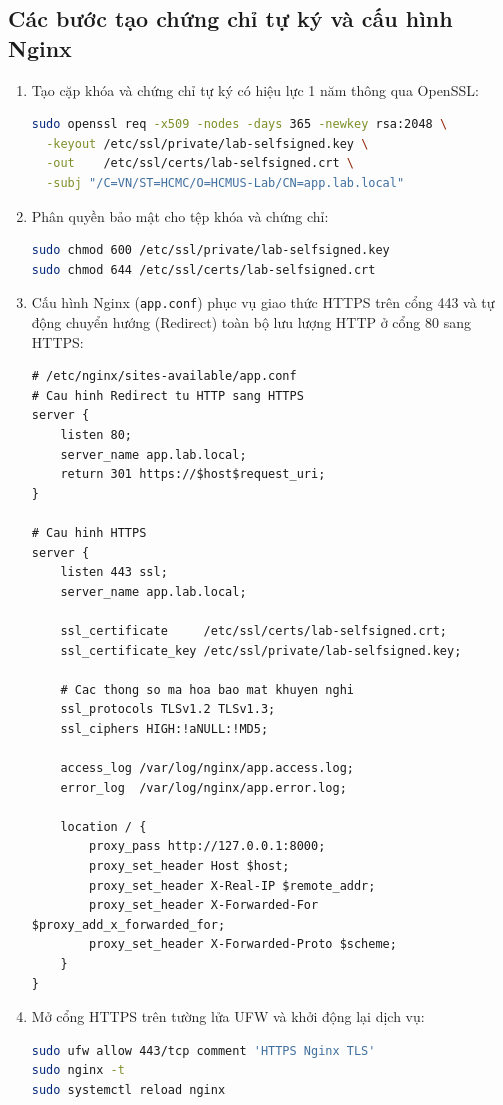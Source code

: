 \documentclass[a4paper,12pt]{article}
\begin{document}
\subsection{Các bước tạo chứng chỉ tự ký và cấu hình Nginx}
\begin{enumerate}
    \item Tạo cặp khóa và chứng chỉ tự ký có hiệu lực 1 năm thông qua OpenSSL:
    \begin{lstlisting}[language=bash]
sudo openssl req -x509 -nodes -days 365 -newkey rsa:2048 \
  -keyout /etc/ssl/private/lab-selfsigned.key \
  -out    /etc/ssl/certs/lab-selfsigned.crt \
  -subj "/C=VN/ST=HCMC/O=HCMUS-Lab/CN=app.lab.local"
    \end{lstlisting}
    \item Phân quyền bảo mật cho tệp khóa và chứng chỉ:
    \begin{lstlisting}[language=bash]
sudo chmod 600 /etc/ssl/private/lab-selfsigned.key
sudo chmod 644 /etc/ssl/certs/lab-selfsigned.crt
    \end{lstlisting}
    \item Cấu hình Nginx (\texttt{app.conf}) phục vụ giao thức HTTPS trên cổng 443 và tự động chuyển hướng (Redirect) toàn bộ lưu lượng HTTP ở cổng 80 sang HTTPS:
    \begin{lstlisting}[frame=single,basicstyle=\ttfamily\scriptsize]
# /etc/nginx/sites-available/app.conf
# Cau hinh Redirect tu HTTP sang HTTPS
server {
    listen 80;
    server_name app.lab.local;
    return 301 https://$host$request_uri;
}

# Cau hinh HTTPS
server {
    listen 443 ssl;
    server_name app.lab.local;

    ssl_certificate     /etc/ssl/certs/lab-selfsigned.crt;
    ssl_certificate_key /etc/ssl/private/lab-selfsigned.key;

    # Cac thong so ma hoa bao mat khuyen nghi
    ssl_protocols TLSv1.2 TLSv1.3;
    ssl_ciphers HIGH:!aNULL:!MD5;

    access_log /var/log/nginx/app.access.log;
    error_log  /var/log/nginx/app.error.log;

    location / {
        proxy_pass http://127.0.0.1:8000;
        proxy_set_header Host $host;
        proxy_set_header X-Real-IP $remote_addr;
        proxy_set_header X-Forwarded-For $proxy_add_x_forwarded_for;
        proxy_set_header X-Forwarded-Proto $scheme;
    }
}
\end{lstlisting}
    \item Mở cổng HTTPS trên tường lửa UFW và khởi động lại dịch vụ:
    \begin{lstlisting}[language=bash]
sudo ufw allow 443/tcp comment 'HTTPS Nginx TLS'
sudo nginx -t
sudo systemctl reload nginx
    \end{lstlisting}
\end{enumerate}
\end{document}
